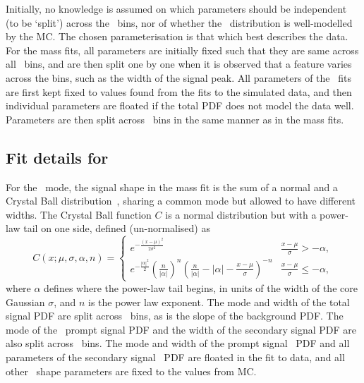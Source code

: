 Initially, no knowledge is assumed on which parameters should be independent 
(to be `split') across the \pTy\ bins, nor of whether the \lnipchisq\ 
distribution is well-modelled by the \ac{MC}.
The chosen parameterisation is that which best describes the data.
For the mass fits, all parameters are initially fixed such that they are same 
across all \pTy\ bins, and are then split one by one when it is observed that a 
feature varies across the bins, such as the width of the signal peak.
All parameters of the \lnipchisq\ fits are first kept fixed to values found 
from the fits to the simulated data, and then individual parameters are floated 
if the total PDF does not model the data well.
Parameters are then split across \pTy\ bins in the same manner as in the mass 
fits.

\subsection{Fit details for \PDzero}
\label{chap:prod:fitting:details:D0ToKpi}

For the \DzToKpi\ mode, the signal shape in the mass fit is the sum of a normal 
and a Crystal Ball distribution~\cite{Skwarnicki:1986xj}, sharing a common mode 
but allowed to have different widths.
The Crystal Ball function $C$ is a normal distribution but with a power-law 
tail on one side, defined (un-normalised) as
\begin{equation}
  C(x; \mu, \sigma, \alpha, n) = \begin{cases}
    e^{-\frac{{(x - \mu)}^{2}}{2\sigma^{2}}}                          & \frac{x - \mu}{\sigma} > -\alpha, \\
    e^{-\frac{|\alpha|^{2}}{2}}
      {(\frac{n}{|\alpha|})}^{n}
      {(\frac{n}{|\alpha|} - |\alpha| - \frac{x - \mu}{\sigma})}^{-n} & \frac{x - \mu}{\sigma} \leq -\alpha,
  \end{cases}
  \label{eqn:prod:fitting:crystal_ball}
\end{equation}
where $\alpha$ defines where the power-law tail begins, in units of the width 
of the core Gaussian $\sigma$, and $n$ is the power law exponent.
The mode and width of the total signal \ac{PDF} are split across \pTy\ bins, as 
is the slope of the background \ac{PDF}.
The mode of the \lnipchisq\ prompt signal \ac{PDF} and the width of the 
secondary signal \ac{PDF} are also split across \pTy\ bins.
The mode and width of the prompt signal \lnipchisq\ \ac{PDF} and all parameters 
of the secondary signal \lnipchisq\ \ac{PDF} are floated in the fit to data, 
and all other \lnipchisq\ shape parameters are fixed to the values from 
\ac{MC}.

